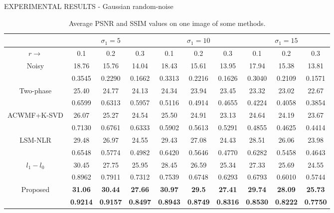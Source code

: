 \begin{frame}{EXPERIMENTAL RESULTS - Gaussian random-noise}
    \begin{table}[h!]
        \centering
        \begin{adjustbox}{max width=0.7\textwidth}
        \begin{tabular}{|c||ccc|ccc|ccc|}
            \hline
                & \multicolumn{3}{c||}{$\sigma_1=5$} & \multicolumn{3}{c||}{$\sigma_1=10$} & \multicolumn{3}{c||}{$\sigma_1=15$}\\
            \hline        
            $r\rightarrow$ & 0.1 & 0.2 & 0.3 & 0.1 & 0.2 & 0.3 & 0.1 & 0.2 & 0.3\\
            \hline 
            \hline
            \multirow{2}{*}{Noisy} & 18.76 & 15.76 & 14.04 & 18.43 & 15.61 & 13.95 & 17.94 & 15.38 & 13.81\\
            & 0.3545 & 0.2290 & 0.1662 & 0.3313 & 0.2216 & 0.1626 & 0.3040 & 0.2109 & 0.1571\\
            \hline
            \multirow{2}{*}{Two-phase\cite{0884882828}} & 25.40 & 24.77 & 24.13 & 24.34 & 23.94 & 23.45 & 23.32 & 23.02 & 22.67\\
            & 0.6599 & 0.6313 & 0.5957 & 0.5116 & 0.4914 & 0.4655 & 0.4224 & 0.4058 & 0.3854\\
            \hline
            \multirow{2}{*}{ACWMF+K-SVD \cite{0884882844}\cite{0884882813}} & 26.07 & 25.27 & 24.54 & 25.50 & 24.91 & 23.13 & 24.64 & 24.19 & 23.67\\
            & 0.7130 & 0.6761 & 0.6333 & 0.5902 & 0.5613 & 0.5291 & 0.4855 & 0.4625 & 0.4414\\
            \hline    
            \multirow{2}{*}{LSM-NLR \cite{0884882826}} & 29.48 & 26.97 & 24.55 & 29.43 & 27.08 & 24.43 & 28.51 & 26.06 & 23.98\\
            & 0.6548 & 0.5774 & 0.4982 & 0.6420 & 0.5646 & 0.4770 & 0.6282 & 0.5458 & 0.4643\\
            \hline
            \multirow{2}{*}{$l_1-l_0$\cite{0884882829}} & 30.45 & 27.75 & 25.95 & 28.45 & 26.59 & 25.34 & 27.33 & 25.69 & 24.55\\
            & 0.8962 & 0.7911 & 0.7312 & 0.7539 & 0.6748 & 0.6293 & 0.6793 & 0.6010 & 0.5744\\
            \hline
            \multirow{2}{*}{Proposed} & \bfseries{31.06} & \bfseries{30.44} & \bfseries{27.66} & \bfseries{30.97} & \bfseries{29.5} & \bfseries{27.41} & \bfseries{29.74} & \bfseries{28.09} & \bfseries{25.73}\\
            & \bfseries{0.9214} & \bfseries{0.9157} & \bfseries{0.8497} & \bfseries{0.8943} & \bfseries{0.8749} & \bfseries{0.8316} & \bfseries{0.8530} & \bfseries{0.8222} & \bfseries{0.7750}\\
            \hline
        \end{tabular}
        \end{adjustbox}
        \caption{Average PSNR and SSIM values on one image of some methods.}
        \label{GNPINIndex}
    \end{table}
\end{frame}

